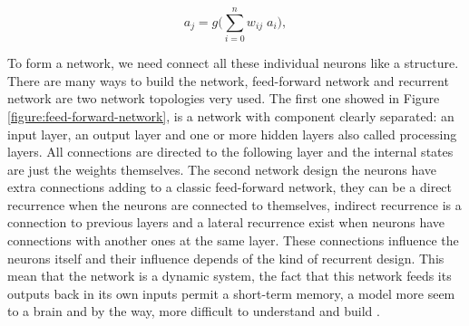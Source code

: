 \documentclass[12pt]{report}
\begin{document}
\begin{equation}
a_j=g\Biggl(\sum_{i=0}^{n} w_{ij}\; a_i\Biggr),
\end{equation}

To form a network, we need connect all these individual neurons like a structure. There are many ways to build the network, feed-forward network and recurrent network are two network topologies very used. The first one showed in Figure \ref{figure:feed-forward-network}, is a network with component clearly separated: an input layer, an output layer and one or more hidden layers also called processing layers. All connections are directed to the following layer and the internal states are just the weights themselves. The second network design the neurons have extra connections adding to a classic feed-forward network, they can be a direct recurrence when the neurons are connected to themselves,  indirect recurrence is a connection to previous layers and a lateral recurrence exist when neurons have connections with another ones at the same layer. These connections influence the neurons itself and their influence depends of the kind of recurrent design. This mean that the network is a dynamic system, the fact that this network feeds its outputs back in its own inputs permit a short-term memory, a model more seem to a brain and by the way, more difficult to understand and build \cite{Kriesel2005} \cite{Russell2010}. 
\end{document}
